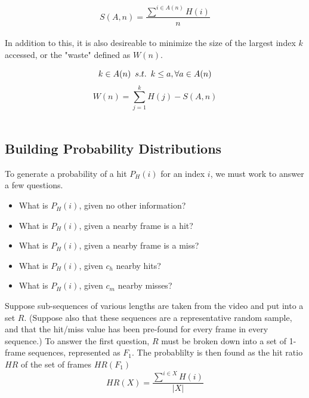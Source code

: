 \documentclass{article}
\def\suchThat{\hspace{0.5em} s.t. \hspace{0.5em}}
\newcommand{\br}{ \hfill \break}
\begin{document}
\begin{adjustwidth}{2.5em}{0pt}
            $$ S(A, n) = \frac{ \displaystyle\sum^{i \in A(n)} H(i) }{ n }$$ \\

        In addition to this, it is also desireable to minimize the size of the largest index $k$ accessed, or the "waste" defined as $W(n)$.

            $$ k \in A(n) \suchThat k \leq a, \forall a \in A(n) $$
            $$ W(n) = \displaystyle\sum_{j=1}^{k} H(j) - S(A, n) $$ \\
        
    
    \subsection{Building Probability Distributions}
        To generate a probability of a hit $P_H(i)$ for an index $i$, we must work to answer a few questions.
        \begin{itemize}
            \item What is $P_H(i)$, given no other information?
            \item What is $P_H(i)$, given a nearby frame is a hit?
            \item What is $P_H(i)$, given a nearby frame is a miss?
            \item What is $P_H(i)$, given $c_h$ nearby hits?
            \item What is $P_H(i)$, given $c_m$ nearby misses?
        \end{itemize}
        Suppose sub-sequences of various lengths are taken from the video and put into a set $R$. (Suppose also that these sequences are a representative random sample, and that the hit/miss value has been pre-found for every frame in every sequence.)
        \br
        \br
        To answer the first question, $R$ must be broken down into a set of 1-frame sequences, represented as $F_1$. The probablilty is then found as the hit ratio $\mathit{HR}$ of the set of frames $HR(F_1)$
            $$ \mathit{HR}(X) =  \frac{ \displaystyle\sum^{i \in X} H(i) }{ |X| }  $$
        

\end{adjustwidth}
\end{document}
